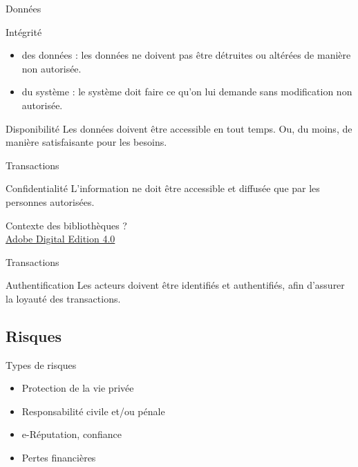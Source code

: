 \documentclass[12pt]{beamer}
\begin{document}
		\begin{frame}{Données}

			\begin{exampleblock}{Intégrité}
				\begin{itemize}
					\item des données : les données ne doivent pas être détruites ou altérées de manière non autorisée.
					\item du système : le système doit faire ce qu'on lui demande sans modification non autorisée.
				\end{itemize}
			\end{exampleblock}
			\begin{exampleblock}{Disponibilité}
				Les données doivent être accessible en tout temps. Ou, du moins, de manière satisfaisante pour les besoins.
			\end{exampleblock}
		\end{frame}
		
		\begin{frame}{Transactions}
			\onslide<1->\begin{exampleblock}{Confidentialité}
				L'information ne doit être accessible et diffusée que par les personnes autorisées.
			\end{exampleblock}
			Contexte des bibliothèques ? \\
			\onslide<3->\href{https://id-libre.org/shaarli/?aUbIGw}{{\color{blue}Adobe Digital Edition 4.0}}
		\end{frame}
		\begin{frame}{Transactions}
			\begin{exampleblock}{Authentification}
				Les acteurs doivent être identifiés et authentifiés, afin d'assurer la loyauté des transactions.
			\end{exampleblock}
		\end{frame}
	
	\subsection{Risques}
	
		\begin{frame}{Types de risques}
			\begin{itemize}
				\item Protection de la vie privée
				\item Responsabilité civile et/ou pénale
				\item e-Réputation, confiance
				\item Pertes financières
			\end{itemize}
		\end{frame}
\end{document}
